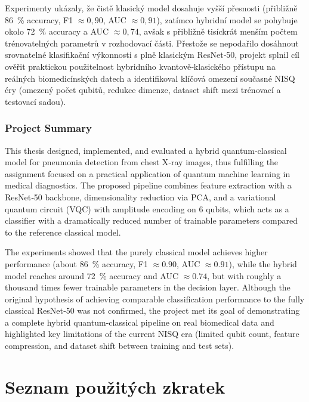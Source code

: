 \documentclass[12pt, a4paper]{report}
\begin{document}
Experimenty ukázaly, že čistě klasický model dosahuje vyšší přesnosti (přibližně 86~\% accuracy, F1 $\approx 0{,}90$, AUC $\approx 0{,}91$), zatímco hybridní model se pohybuje okolo 72~\% accuracy a AUC $\approx 0{,}74$, avšak s přibližně tisíckrát menším počtem trénovatelných parametrů v rozhodovací části. Přestože se nepodařilo dosáhnout srovnatelné klasifikační výkonnosti s plně klasickým ResNet‑50, projekt splnil cíl ověřit praktickou použitelnost hybridního kvantově‑klasického přístupu na reálných biomedicínských datech a identifikoval klíčová omezení současné NISQ éry (omezený počet qubitů, redukce dimenze, dataset shift mezi trénovací a testovací sadou).

\subsection{Project Summary}

This thesis designed, implemented, and evaluated a hybrid quantum‑classical model for pneumonia detection from chest X‑ray images, thus fulfilling the assignment focused on a practical application of quantum machine learning in medical diagnostics. The proposed pipeline combines feature extraction with a ResNet‑50 backbone, dimensionality reduction via PCA, and a variational quantum circuit (VQC) with amplitude encoding on 6 qubits, which acts as a classifier with a dramatically reduced number of trainable parameters compared to the reference classical model.

The experiments showed that the purely classical model achieves higher performance (about 86~\% accuracy, F1 $\approx 0.90$, AUC $\approx 0.91$), while the hybrid model reaches around 72~\% accuracy and AUC $\approx 0.74$, but with roughly a thousand times fewer trainable parameters in the decision layer. Although the original hypothesis of achieving comparable classification performance to the fully classical ResNet‑50 was not confirmed, the project met its goal of demonstrating a complete hybrid quantum‑classical pipeline on real biomedical data and highlighted key limitations of the current NISQ era (limited qubit count, feature compression, and dataset shift between training and test sets).



\printbibliography[title={Seznam použité literatury}, heading=bibintoc]

\chapter*{Seznam použitých zkratek}
\end{document}
